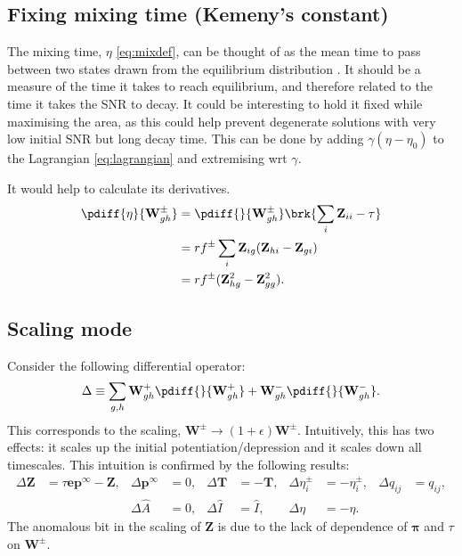 \documentclass[12pt]{article}
\newcommand{\onev}{\mathbf{e}}
\newcommand{\eq}{\mathbf{p}^\infty}
\newcommand{\fpt}{\mathbf{T}}
\newcommand{\fund}{\mathbf{Z}}
\newcommand{\pib}{\boldsymbol{\pi}}
\newcommand{\W}{\mathbf{W}}
\begin{document}
\subsection{Fixing mixing time (Kemeny's  constant)}\label{sec:fixmix}

The mixing time, $\eta$ \eqref{eq:mixdef}, can be thought of as the mean time to pass between two states drawn from the equilibrium distribution \cite{hunter2006mixing,levene2002kemeny}. It should be a measure of the time it takes to reach equilibrium, and therefore related to the time it takes the SNR to decay. It could be interesting to hold it fixed while maximising the area, as this could help prevent degenerate solutions with very low initial SNR but long decay time. This can be done by adding $\gamma(\eta-\eta_0)$ to the Lagrangian \eqref{eq:lagrangian} and extremising wrt $\gamma$.

It would help to calculate its derivatives.
%
\begin{equation}\label{eq:mixingdiff}
  \begin{aligned}
    \pdiff{\eta}{\W^\pm_{gh}} &= \pdiff{}{\W^\pm_{gh}}\brk{\sum_i \fund_{ii} - \tau} \\
      &= rf^\pm \sum_i \fund_{ig}(\fund_{hi}-\fund_{gi}) \\
      &= rf^\pm (\fund^2_{hg} - \fund^2_{gg}).
  \end{aligned}
\end{equation}
%

\subsection{Scaling mode}\label{sec:rescaleconstr}

Consider the following differential operator:
%
\begin{equation}\label{eq:scaleopapp}
  \Delta \equiv \sum_{g,h} \W^+_{gh}\pdiff{}{\W^+_{gh}} + \W^-_{gh}\pdiff{}{\W^-_{gh}}.
\end{equation}
%
This corresponds to the scaling, $\W^\pm \to (1+\epsilon)\W^\pm$. Intuitively, this has two effects: it scales up the initial potentiation/depression and it scales down all timescales. This intuition is confirmed by the following results:
%
\begin{equation}\label{eq:scaleeffectsapp}
  \begin{aligned}
    \Delta \fund &= \tau\onev\eq - \fund ,&
    \Delta \eq  &= 0 ,&
    \Delta \fpt  &= -\fpt ,&
    \Delta \eta^\pm_i  &= - \eta^\pm_i ,&
    \Delta q_{ij} &= q_{ij} ,
    \\&&
    \Delta \hat{A}  &= 0 ,&
    \Delta \hat{I} &= \hat{I} ,&
    \Delta \eta  &= -\eta .
  \end{aligned}
\end{equation}
%
The anomalous bit in the scaling of $\fund$ is due to the lack of dependence of $\pib$ and $\tau$ on $\W^\pm$.
\end{document}

